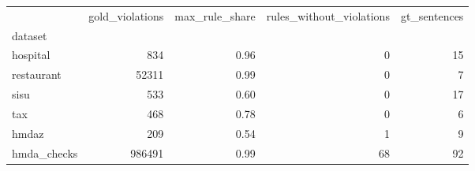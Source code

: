 \begin{tabular}{lrrrr}
\toprule
 & gold_violations & max_rule_share & rules_without_violations & gt_sentences \\
dataset &  &  &  &  \\
\midrule
hospital & 834 & 0.96 & 0 & 15 \\
restaurant & 52311 & 0.99 & 0 & 7 \\
sisu & 533 & 0.60 & 0 & 17 \\
tax & 468 & 0.78 & 0 & 6 \\
hmdaz & 209 & 0.54 & 1 & 9 \\
hmda_checks & 986491 & 0.99 & 68 & 92 \\
\bottomrule
\end{tabular}
